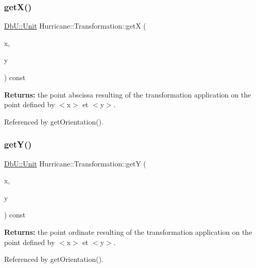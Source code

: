 \subsubsection{\texorpdfstring{get\+X()}{getX()}\hspace{0.1cm}{\footnotesize\ttfamily [1/2]}}
{\footnotesize\ttfamily \hyperlink{group__DbUGroup_ga4fbfa3e8c89347af76c9628ea06c4146}{Db\+U\+::\+Unit} Hurricane\+::\+Transformation\+::getX (\begin{DoxyParamCaption}\item[{const \hyperlink{group__DbUGroup_ga4fbfa3e8c89347af76c9628ea06c4146}{Db\+U\+::\+Unit} \&}]{x,  }\item[{const \hyperlink{group__DbUGroup_ga4fbfa3e8c89347af76c9628ea06c4146}{Db\+U\+::\+Unit} \&}]{y }\end{DoxyParamCaption}) const}

{\bfseries Returns\+:} the point abscissa resulting of the transformation application on the point defined by {\ttfamily $<$x$>$} et {\ttfamily $<$y$>$}. 

Referenced by get\+Orientation().

\mbox{\label{classHurricane_1_1Transformation_a8ad883a70823c00772293549b6e611e7}} 
\subsubsection{\texorpdfstring{get\+Y()}{getY()}\hspace{0.1cm}{\footnotesize\ttfamily [1/2]}}
{\footnotesize\ttfamily \hyperlink{group__DbUGroup_ga4fbfa3e8c89347af76c9628ea06c4146}{Db\+U\+::\+Unit} Hurricane\+::\+Transformation\+::getY (\begin{DoxyParamCaption}\item[{const \hyperlink{group__DbUGroup_ga4fbfa3e8c89347af76c9628ea06c4146}{Db\+U\+::\+Unit} \&}]{x,  }\item[{const \hyperlink{group__DbUGroup_ga4fbfa3e8c89347af76c9628ea06c4146}{Db\+U\+::\+Unit} \&}]{y }\end{DoxyParamCaption}) const}

{\bfseries Returns\+:} the point ordinate resulting of the transformation application on the point defined by {\ttfamily $<$x$>$} et {\ttfamily $<$y$>$}. 

Referenced by get\+Orientation().

